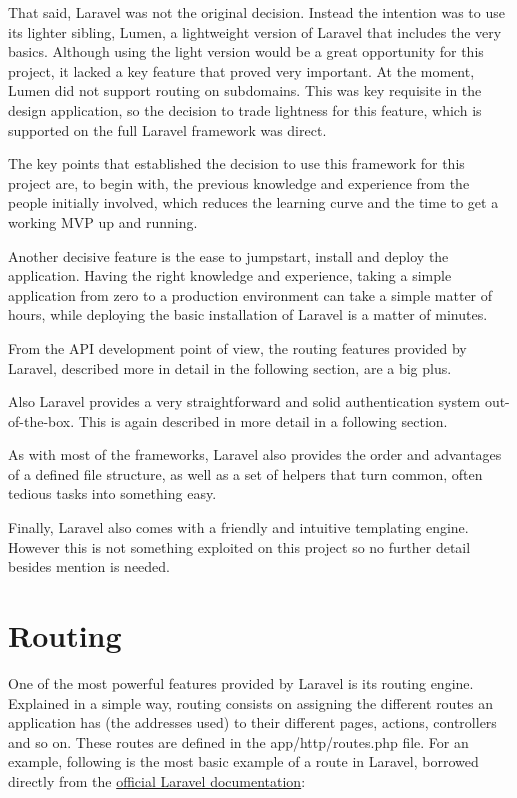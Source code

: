 That said, Laravel was not the original decision. Instead the intention was to use its lighter sibling, Lumen, a lightweight version of Laravel that includes the very basics. Although using the light version would be a great opportunity for this project, it lacked a key feature that proved very important. At the moment, Lumen did not support routing on subdomains. This was key requisite in the design application, so the decision to trade lightness for this feature, which is supported on the full Laravel framework was direct.

The key points that established the decision to use this framework for this project are, to begin with, the previous knowledge and experience from the people initially involved, which reduces the learning curve and the time to get a working MVP up and running.

Another decisive feature is the ease to jumpstart, install and deploy the application. Having the right knowledge and experience, taking a simple application from zero to a production environment can take a simple matter of hours, while deploying the basic installation of Laravel is a matter of minutes.

From the API development point of view, the routing features provided by Laravel, described more in detail in the following section, are a big plus.

Also Laravel provides a very straightforward and solid authentication system out-of-the-box. This is again described in more detail in a following section.

As with most of the frameworks, Laravel also provides the order and advantages of a defined file structure, as well as a set of helpers that turn common, often tedious tasks into something easy.

Finally, Laravel also comes with a friendly and intuitive templating engine. However this is not something exploited on this project so no further detail besides mention is needed.

\section{Routing}
One of the most powerful features provided by Laravel is its routing engine. Explained in a simple way, routing consists on assigning the different routes an application has (the addresses used) to their different pages, actions, controllers and so on. These routes are defined in the app/http/routes.php file. For an example, following is the most basic example of a route in Laravel, borrowed directly from the \href{https://laravel.com/docs/5.3/routing}{official Laravel documentation}:

